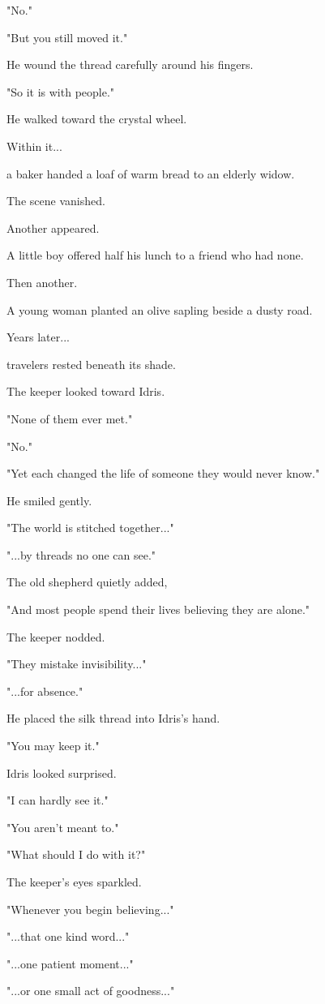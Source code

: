 \documentclass[12pt,openany]{book}
\begin{document}
"No."

"But you still moved it."

He wound the thread carefully around his fingers.

"So it is with people."

He walked toward the crystal wheel.

Within it...

a baker handed a loaf of warm bread to an elderly widow.

The scene vanished.

Another appeared.

A little boy offered half his lunch to a friend who had none.

Then another.

A young woman planted an olive sapling beside a dusty road.

Years later...

travelers rested beneath its shade.

The keeper looked toward Idris.

"None of them ever met."

"No."

"Yet each changed the life of someone they would never know."

He smiled gently.

"The world is stitched together..."

"...by threads no one can see."

The old shepherd quietly added,

"And most people spend their lives believing they are alone."

The keeper nodded.

"They mistake invisibility..."

"...for absence."

He placed the silk thread into Idris's hand.

"You may keep it."

Idris looked surprised.

"I can hardly see it."

"You aren't meant to."

"What should I do with it?"

The keeper's eyes sparkled.

"Whenever you begin believing..."

"...that one kind word..."

"...one patient moment..."

"...or one small act of goodness..."
\end{document}
